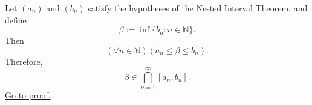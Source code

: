 \begin{corollary}
\label{cor:nested-interval-intersection-contains-endpoint-infimum}
Let $(a_n)$ and $(b_n)$ satisfy the hypotheses of the Nested Interval Theorem,
and define
\[
  \beta:=\inf\{b_n:n\in\mathbb{N}\}.
\]
Then
\[
  (\forall n\in\mathbb{N})(a_n\leq\beta\leq b_n).
\]
Therefore,
\[
  \beta\in \bigcap_{n=1}^{\infty}[a_n,b_n].
\]
\hyperref[prf:nested-interval-intersection-contains-endpoint-infimum]{Go to proof.}
\end{corollary}